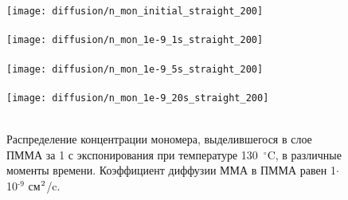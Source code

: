 \begin{figure}[H]
	\begin{center}
		\texttt{[image: diffusion/n\_mon\_initial\_straight\_200]} \\
		\vspace{-4em}  \vspace{2.2em} \\
		\texttt{[image: diffusion/n\_mon\_1e-9\_1s\_straight\_200]} \\
		\vspace{-4em}  \vspace{2.2em} \\
		\texttt{[image: diffusion/n\_mon\_1e-9\_5s\_straight\_200]} \\
		\vspace{-4em}  \vspace{2.2em} \\
		\texttt{[image: diffusion/n\_mon\_1e-9\_20s\_straight\_200]} \\
		\vspace{-4em}  \vspace{2.2em} \\
	\end{center}
	\vspace{-1em}
	\caption{Распределение концентрации мономера, выделившегося в слое ПММА за 1 с экспонирования при температуре 130~$^\circ$C, в различные моменты времени. Коэффициент диффузии ММА в ПММА равен 1\:$\cdot$\,10$^\text{-9}$ см$^\text{2}$/c.}
	\label{fig:diffusion_10s}
\end{figure}
